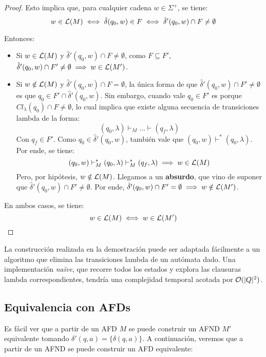 \begin{proof}
    Esto implica que, para cualquier cadena $w \in \Sigma^+$, se tiene:
    $$w \in \mathcal{L}(M) \iff \hat \delta(q_0, w) \in F \iff \hat \delta'(q_0, w) \cap F \neq \emptyset$$

    Entonces:
    \begin{itemize}
        \item Si $w \in \mathcal{L}(M)$ y $\hat \delta'(q_0, w) \cap F \neq \emptyset$, como $F \subseteq F'$, $\hat \delta'(q_0, w) \cap F' \neq \emptyset \implies w \in \mathcal{L}(M')$.
        \item Si $w \notin \mathcal{L}(M)$ y $\hat \delta'(q_0, w) \cap F = \emptyset$, la única forma de que $\hat \delta'(q_0, w) \cap F' \neq \emptyset$ es que $q_0 \in F' \cap \hat \delta'(q_0, w)$. Sin embargo, cuando vale $q_0 \in F'$ es porque $Cl_\lambda(q_0) \cap F \neq \emptyset$, lo cual implica que existe alguna secuencia de transiciones lambda de la forma:
        $$(q_0, \lambda) \vdash_M \dots \vdash (q_f, \lambda)$$
        Con $q_f \in F'$. Como $q_0 \in \hat \delta'(q_0, w)$, también vale que $(q_0, w) \vdash^* (q_0, \lambda)$. Por ende, se tiene:
        $$(q_0, w) \vdash_M^* (q_0, \lambda) \vdash_M^* (q_f, \lambda) \implies w \in \mathcal{L}(M)$$
        Pero, por hipótesis, $w \notin \mathcal{L}(M)$. Llegamos a un \textbf{absurdo}, que vino de suponer que $\hat \delta'(q_0, w) \cap F' \neq \emptyset$. Por ende, $\hat \delta'(q_0, w) \cap F' = \emptyset \implies w \notin \mathcal{L}(M')$.
    \end{itemize}

    En ambos casos, se tiene:
    $$w \in \mathcal{L}(M) \iff w \in \mathcal{L}(M')$$
\end{proof}

La construcción realizada en la demostración puede ser adaptada fácilmente a un algoritmo que elimina las transiciones lambda de un autómata dado. Una implementación \textit{naïve}, que recorre todos los estados y explora las clausuras lambda correspondientes, tendría una complejidad temporal acotada por $\mathcal{O}(|Q|^2)$.

\subsection{Equivalencia con AFDs}

Es fácil ver que a partir de un AFD $M$ se puede construir un AFND $M'$ equivalente tomando $\delta'(q, a) = \{\delta(q, a)\}$. A continuación, veremos que a partir de un AFND se puede construir un AFD equivalente:

